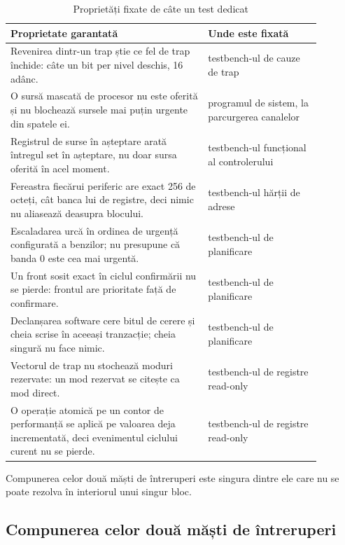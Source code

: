 \documentclass[11pt,openany]{report}
\begin{document}
\begin{table}[H]
\centering
\caption{Proprietăți fixate de câte un test dedicat}
\label{tab:proprietati}
\small
\begin{tabular}{@{}L{0.56\linewidth}L{0.32\linewidth}@{}}
\toprule
\textbf{Proprietate garantată} & \textbf{Unde este fixată} \\
\midrule
Revenirea dintr-un trap știe ce fel de trap închide: câte un bit per nivel
deschis, 16 adânc. & testbench-ul de cauze de trap \\
\addlinespace
O sursă mascată de procesor nu este oferită și nu blochează sursele mai puțin
urgente din spatele ei. & programul de sistem, la parcurgerea canalelor \\
\addlinespace
Registrul de surse în așteptare arată întregul set în așteptare, nu doar sursa
oferită în acel moment. & testbench-ul funcțional al controlerului \\
\addlinespace
Fereastra fiecărui periferic are exact 256 de octeți, cât banca lui de registre,
deci nimic nu aliasează deasupra blocului. & testbench-ul hărții de adrese \\
\addlinespace
Escaladarea urcă în ordinea de urgență configurată a benzilor; nu presupune că
banda 0 este cea mai urgentă. & testbench-ul de planificare \\
\addlinespace
Un front sosit exact în ciclul confirmării nu se pierde: frontul are prioritate
față de confirmare. & testbench-ul de planificare \\
\addlinespace
Declanșarea software cere bitul de cerere și cheia scrise în aceeași tranzacție;
cheia singură nu face nimic. & testbench-ul de planificare \\
\addlinespace
Vectorul de trap nu stochează moduri rezervate: un mod rezervat se citește ca
mod direct. & testbench-ul de registre read-only \\
\addlinespace
O operație atomică pe un contor de performanță se aplică pe valoarea deja
incrementată, deci evenimentul ciclului curent nu se pierde. & testbench-ul de
registre read-only \\
\bottomrule
\end{tabular}
\end{table}

Compunerea celor două măști de întreruperi este singura dintre ele care nu se
poate rezolva în interiorul unui singur bloc.

\subsection{Compunerea celor două măști de întreruperi}
\label{sec:doua-masti}
\end{document}
